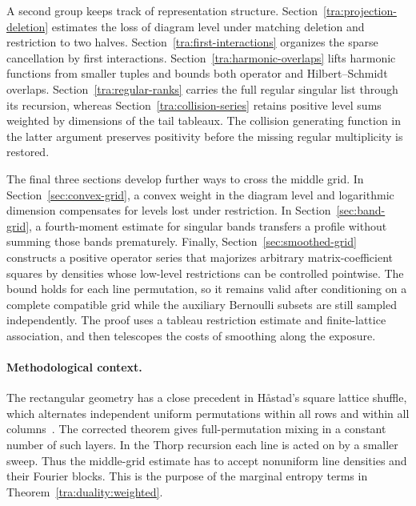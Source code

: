 A second group keeps track of representation structure. Section~\ref{tra:projection-deletion} estimates the loss of diagram level under matching deletion and restriction to two halves. Section~\ref{tra:first-interactions} organizes the sparse cancellation by first interactions. Section~\ref{tra:harmonic-overlaps} lifts harmonic functions from smaller tuples and bounds both operator and Hilbert--Schmidt overlaps. Section~\ref{tra:regular-ranks} carries the full regular singular list through its recursion, whereas Section~\ref{tra:collision-series} retains positive level sums weighted by dimensions of the tail tableaux. The collision generating function in the latter argument preserves positivity before the missing regular multiplicity is restored.

The final three sections develop further ways to cross the middle grid. In Section~\ref{sec:convex-grid}, a convex weight in the diagram level and logarithmic dimension compensates for levels lost under restriction. In Section~\ref{sec:band-grid}, a fourth-moment estimate for singular bands transfers a profile without summing those bands prematurely. Finally, Section~\ref{sec:smoothed-grid} constructs a positive operator series that majorizes arbitrary matrix-coefficient squares by densities whose low-level restrictions can be controlled pointwise. The bound holds for each line permutation, so it remains valid after conditioning on a complete compatible grid while the auxiliary Bernoulli subsets are still sampled independently. The proof uses a tableau restriction estimate and finite-lattice association, and then telescopes the costs of smoothing along the exposure.

\paragraph{Methodological context.}
The rectangular geometry has a close precedent in H\aa stad's square lattice shuffle, which alternates independent uniform permutations within all rows and within all columns~\cite{Hastad2006,Hastad2016}. The corrected theorem gives full-permutation mixing in a constant number of such layers. In the Thorp recursion each line is acted on by a smaller sweep. Thus the middle-grid estimate has to accept nonuniform line densities and their Fourier blocks. This is the purpose of the marginal entropy terms in Theorem~\ref{tra:duality:weighted}.

